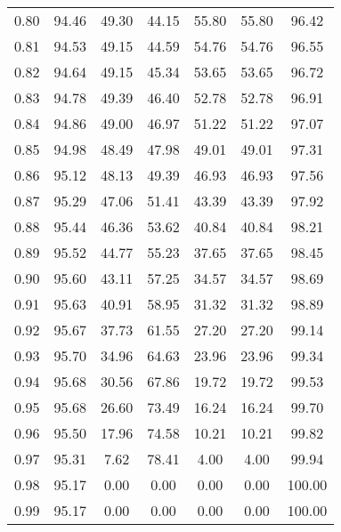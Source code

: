 \begin{tabular}{|c|c|c|c|c|c|c|}
      0.80 &     94.46 &     49.30 &      44.15 &   55.80 &      55.80 &         96.42 \\
      0.81 &     94.53 &     49.15 &      44.59 &   54.76 &      54.76 &         96.55 \\
      0.82 &     94.64 &     49.15 &      45.34 &   53.65 &      53.65 &         96.72 \\
      0.83 &     94.78 &     49.39 &      46.40 &   52.78 &      52.78 &         96.91 \\
      0.84 &     94.86 &     49.00 &      46.97 &   51.22 &      51.22 &         97.07 \\
      0.85 &     94.98 &     48.49 &      47.98 &   49.01 &      49.01 &         97.31 \\
      0.86 &     95.12 &     48.13 &      49.39 &   46.93 &      46.93 &         97.56 \\
      0.87 &     95.29 &     47.06 &      51.41 &   43.39 &      43.39 &         97.92 \\
      0.88 &     95.44 &     46.36 &      53.62 &   40.84 &      40.84 &         98.21 \\
      0.89 &     95.52 &     44.77 &      55.23 &   37.65 &      37.65 &         98.45 \\
      0.90 &     95.60 &     43.11 &      57.25 &   34.57 &      34.57 &         98.69 \\
      0.91 &     95.63 &     40.91 &      58.95 &   31.32 &      31.32 &         98.89 \\
      0.92 &     95.67 &     37.73 &      61.55 &   27.20 &      27.20 &         99.14 \\
      0.93 &     95.70 &     34.96 &      64.63 &   23.96 &      23.96 &         99.34 \\
      0.94 &     95.68 &     30.56 &      67.86 &   19.72 &      19.72 &         99.53 \\
      0.95 &     95.68 &     26.60 &      73.49 &   16.24 &      16.24 &         99.70 \\
      0.96 &     95.50 &     17.96 &      74.58 &   10.21 &      10.21 &         99.82 \\
      0.97 &     95.31 &      7.62 &      78.41 &    4.00 &       4.00 &         99.94 \\
      0.98 &     95.17 &      0.00 &       0.00 &    0.00 &       0.00 &        100.00 \\
      0.99 &     95.17 &      0.00 &       0.00 &    0.00 &       0.00 &        100.00 \\
\bottomrule
\end{tabular}
